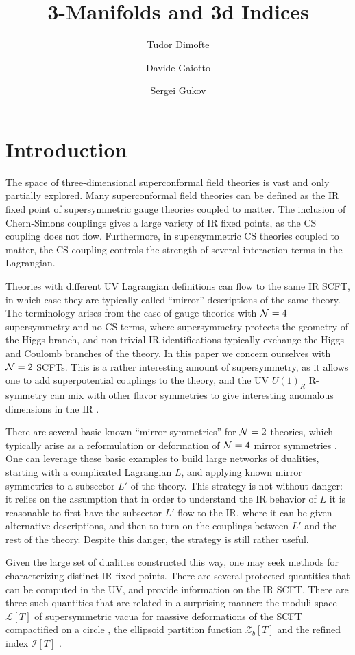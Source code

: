 \documentclass[11pt,letterpaper]{article}
\title{3-Manifolds and 3d Indices}
\author[1,2]{Tudor Dimofte}
\author[1]{Davide Gaiotto}
\author[3,4]{Sergei Gukov}
\affiliation[1]{Institute for Advanced Study, Einstein Dr., Princeton, NJ 08540, USA}
\affiliation[2]{Trinity College, Cambridge CB2 1TQ, UK}
\affiliation[3]{California Institute of Technology, Pasadena, CA 91125, USA}
\affiliation[4]{Max-Planck-Institut f\"ur Mathematik, Vivatsgasse 7, D-53111 Bonn, Germany}
\numberwithin{equation}{section}
\newcommand{\CI}{\mathcal{I}}
\newcommand{\CL}{\mathcal{L}}
\newcommand{\CZ}{\mathcal{Z}}
\begin{document}
\maketitle


\section{Introduction}
\label{sec:intro}


The space of three-dimensional superconformal field theories is vast and only partially explored. Many superconformal field theories
can be defined as the IR fixed point of supersymmetric gauge theories coupled to matter. The inclusion of Chern-Simons couplings
gives a large variety of IR fixed points, as the CS coupling does not flow. Furthermore, in supersymmetric CS theories coupled to matter,
the CS coupling controls the strength of several interaction terms in the Lagrangian.

Theories with different  UV Lagrangian definitions can flow to the same IR SCFT, in which case they are typically called ``mirror''
descriptions of the same theory. The terminology arises from the case of gauge theories with ${\cal N}=4$ supersymmetry and no CS terms,
where supersymmetry protects the geometry of the Higgs branch, and non-trivial IR identifications typically exchange the Higgs and Coulomb branches of the theory.
In this paper we concern ourselves with ${\cal N}=2$ SCFTs. This is a rather interesting amount of supersymmetry, as it allows one to add superpotential couplings
to the theory, and the UV $U(1)_R$ R-symmetry can mix with other flavor symmetries to give interesting anomalous dimensions in the IR \cite{IW-amax, Jafferis-Zmin}.


There are several basic known ``mirror symmetries'' for ${\cal N}=2$ theories, which typically arise as a reformulation or deformation of ${\cal N}=4$ mirror symmetries \cite{IS, dBHOY, AHISS, dBHO}.
One can leverage these basic examples to build large networks of dualities, starting with a complicated Lagrangian $L$, and applying known mirror symmetries to a subsector $L'$ of the theory.
This strategy is not without danger: it relies on the assumption that in order to understand the IR behavior of $L$ it is reasonable to first have the subsector $L'$ flow to the IR, where it can be given alternative descriptions, and then to turn on the couplings between $L'$ and the rest of the theory.
Despite this danger, the strategy is still rather useful.

Given the large set of dualities constructed this way, one may seek methods for characterizing distinct IR fixed points. There are several
protected quantities that can be computed in the UV, and provide information on the IR SCFT. There are three such quantities that
are related in a surprising manner: the moduli space $\CL[T]$ of supersymmetric vacua for massive deformations of the SCFT compactified on a circle \cite{NS-I, DGH, DG-Sdual},
the ellipsoid partition function $\CZ_b[T]$ \cite{Kapustin-3dloc, HLP-wall, HHL} and the refined index $\CI[T]$ \cite{BBMR-index, Kim-index, IY-index, KSV-index, KW-index}.
\end{document}
